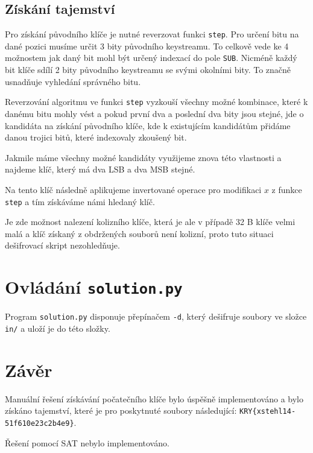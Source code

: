 \documentclass[11pt,a4paper]{article}
\begin{document}
\subsection{Získání tajemství}

Pro získání původního klíče je nutné reverzovat funkci \texttt{step}. Pro určení bitu na dané pozici musíme určit 3 bity
původního keystreamu. To celkově vede ke 4 možnostem jak daný bit mohl být určený indexací do pole \texttt{SUB}. Nicméně
každý bit klíče sdílí 2 bity původního keystreamu se svými okolními bity. To značně usnadňuje vyhledání správného bitu.

Reverzování algoritmu ve funkci \texttt{step} vyzkouší všechny možné kombinace, které k danému bitu mohly vést a pokud
první dva a poslední dva bity jsou stejné, jde o kandidáta na získání původního klíče, kde k existujícím kandidátům
přidáme danou trojici bitů, které indexovaly zkoušený bit.

Jakmile máme všechny možné kandidáty využijeme znova této vlastnosti a najdeme klíč, který má dva LSB a dva MSB stejné.

Na tento klíč následně aplikujeme invertované operace pro modifikaci $x$ z funkce \texttt{step} a tím získáváme námi
hledaný klíč.

Je zde možnost nalezení kolizního klíče, která je ale v případě 32 B klíče velmi malá a klíč získaný z obdržených
souborů není kolizní, proto tuto situaci dešifrovací skript nezohledňuje.

\section{Ovládání \texttt{solution.py}}
Program \texttt{solution.py} disponuje přepínačem \texttt{-d}, který dešifruje soubory ve složce \texttt{in/} a uloží je
do této složky.

\section{Závěr}
Manuální řešení získávání počatečního klíče bylo úspěšně implementováno a bylo získáno tajemství, které je pro
poskytnuté soubory následující: \texttt{KRY\{xstehl14-51f610e23c2b4e9\}}.

Řešení pomocí SAT nebylo implementováno.
\end{document}

